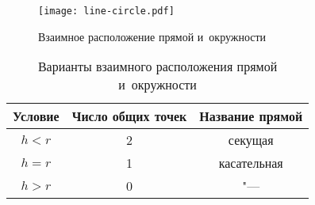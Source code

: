 \documentclass[]{scrartcl}
\begin{document}
\begin{figure}[ht]
	\centering %
	\texttt{[image: line-circle.pdf]}
	\caption{Взаимное расположение прямой и~окружности}\label{fig:line-circle}
\end{figure}

\begin{table}[ht]
	\caption{Варианты взаимного расположения прямой и~окружности}  \label{tab:line-circ}
	\centering%
	\begin{tabularx}{\textwidth}{ccc} 
		\hline
	Условие&Число общих точек&Название прямой\\ \hline
	${\textstyle h<r}$&2&секущая\\ \hline
	${\textstyle h=r}$&1&касательная\\ \hline
	${\textstyle h>r}$&0&"---\\ \hline
	\end{tabularx}
	\end{table}
\end{document}
